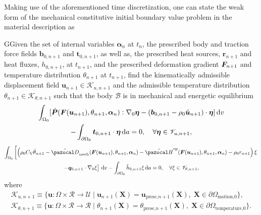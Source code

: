 Making use of the aforementioned time discretization, one can state the weak form of the mechanical constitutive initial boundary value problem in the material description as
\begin{problem}
    GGiven the set of internal variables $\bm \alpha_n$ at $t_n$, the prescribed body and traction force fields $\bm b_{0,n+1}$ and $\bm t_{0,n+1}$, as well as, the prescribed heat sources, \(\bm r_{n+1}\) and heat fluxes, \(h_{0,n+1}\), at $t_{n+1}$, and the prescribed deformation gradient $\bm{F}_{n+1}$ and temperature distribution \(\theta_{n+1}\) at $t_{n+1}$, find the kinematically admissible displacement field $\bm u_{n+1}\in\mathscr{K}_{u,n+1}$ and the admissible temperature distribution \(\theta_{n+1}\in\mathscr K_{\theta,n+1}\) such that the body $\mathscr{B}$ is in mechanical and energetic equilibrium
            \begin{multline}
        \int_{\Omega_0} [\hat{\bm{P}}(\bm{F}(\bm u_{n+1}), \theta_{n+1}, \bm \alpha_n):\nabla_0 \bm \eta - (\bm b_{0,n+1}-\rho_0\ddot{\bm u}_{n+1})\cdot \bm \eta]\,\mathrm{d} v\\ - \int_{\partial\Omega_0} \bm t_{0,n+1}\cdot \bm \eta\,\mathrm{d} a = 0,\quad \forall \bm \eta \in \mathscr{V}_{u,n+1},
        \end{multline}
        \begin{multline}
        \int_{\Omega_0}   \left[\left(\rho_0C_\mathrm{V}\dot\theta_{n+1} -\hat{\pazocal D}_\text{mech}(\bm F(\bm u_{n+1}), \theta_{n+1}, \bm \alpha_n) - \hat{\pazocal H}^\text{ep}(\bm{F}(\bm u_{n+1}), \theta_{n+1}, \bm \alpha_n)- \rho_0 r_{n+1} \right) \xi\right.\\
        \left. - \bm q_{0,n+1}\cdot \nabla_0 \xi\right]\ud v - \int_{\partial\Omega_0} \hat h_{0,n+1} \xi\ud a = 0,\quad \forall \xi \in \mathscr{V}_{\theta,n+1},
    \end{multline}
    where
    \begin{gather}
            \mathscr{K}_{u,n+1}\equiv \{\bm u:\Omega\times \mathscr{R}\to \mathscr{U}\;|\;\bm u_{n+1}(\bm X) = \bm u_\text{presc,$n+1$}(\bm X),\;\bm X\in\partial \Omega_\text{motion,0}\},\\
            \mathscr{K}_{\theta, n+1}\equiv \{\bm u:\Omega\times \mathscr{R}\to \mathscr{R}\;|\;\theta_{n+1}(\bm X) = \theta_\text{presc,$n+1$}(\bm X),\;\bm X\in\partial \Omega_\text{temperature,0}\}.
    \end{gather}
\end{problem}


